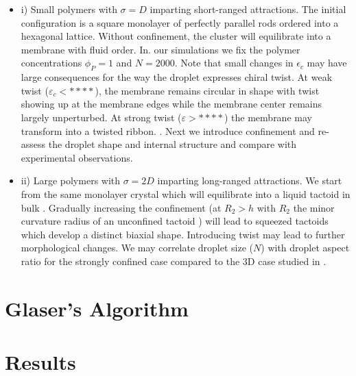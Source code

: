 \begin{itemize}
\item  i) Small polymers with $\sigma = D$ imparting short-ranged attractions. The initial configuration is a square monolayer of perfectly parallel rods ordered into a hexagonal lattice. Without confinement, the cluster will equilibrate into a membrane with  fluid order. In. our simulations we fix the polymer concentrations $\phi_{P}=1$ and $N=2000$. Note that small changes in $\epsilon_{c}$ may have large consequences for the way the droplet expresses chiral twist. At weak twist ($\varepsilon_{c} < ****$), the membrane remains circular in shape with twist showing up at the membrane edges while the membrane center remains largely unperturbed. At strong twist ($\varepsilon > ****$) the membrane may transform into a twisted ribbon. .  Next we introduce confinement and re-assess the droplet shape and internal structure and compare with experimental observations.

\item ii) Large polymers with $\sigma = 2 D$ imparting long-ranged attractions. We start from the same monolayer crystal which will equilibrate into a liquid tactoid in bulk \cite{kuhnhold2022structure}. Gradually increasing the confinement (at $R_{2} > h$ with $R_{2}$ the minor curvature radius of an unconfined tactoid \cite{kuhnhold2022structure})  will lead to squeezed tactoids which  develop a distinct biaxial shape. Introducing twist may lead to further morphological changes. We may correlate droplet size ($N$) with droplet aspect ratio for the strongly confined case compared to the 3D case studied in \cite{kuhnhold2022structure}.

\end{itemize}


\section{Glaser's Algorithm}

\section{Results}

